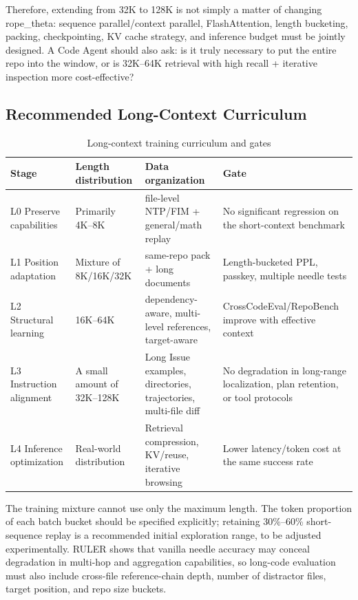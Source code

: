 \documentclass[10pt,a4paper,UTF8,fontset=none]{ctexart}
\newcommand{\ident}[1]{{\rmfamily #1}}
\begin{document}
Therefore, extending from 32K to 128K is not simply a matter of changing \ident{rope\_theta}: sequence parallel/context parallel, FlashAttention, length bucketing, packing, checkpointing, KV cache strategy, and inference budget must be jointly designed. A Code Agent should also ask: is it truly necessary to put the entire repo into the window, or is 32K--64K retrieval with high recall + iterative inspection more cost-effective?

\subsection{Recommended Long-Context Curriculum}

\begin{table}[htbp]
\centering
\caption{Long-context training curriculum and gates}
\label{en:tab:long-curriculum}
\small
\begin{tabularx}{\textwidth}{p{2.2cm}p{2.5cm}YY}
\toprule
Stage & Length distribution & Data organization & Gate \\
\midrule
L0 Preserve capabilities & Primarily 4K--8K & file-level NTP/FIM + general/math replay & No significant regression on the short-context benchmark \\
L1 Position adaptation & Mixture of 8K/16K/32K & same-repo pack + long documents & Length-bucketed PPL, passkey, multiple needle tests \\
L2 Structural learning & 16K--64K & dependency-aware, multi-level references, target-aware & CrossCodeEval/RepoBench improve with effective context \\
L3 Instruction alignment & A small amount of 32K--128K & Long Issue examples, directories, trajectories, multi-file diff & No degradation in long-range localization, plan retention, or tool protocols \\
L4 Inference optimization & Real-world distribution & Retrieval compression, KV/reuse, iterative browsing & Lower latency/token cost at the same success rate \\
\bottomrule
\end{tabularx}
\end{table}

The training mixture cannot use only the maximum length. The token proportion of each batch bucket should be specified explicitly; retaining 30\%--60\% short-sequence replay is a recommended initial exploration range, to be adjusted experimentally. RULER shows that vanilla needle accuracy may conceal degradation in multi-hop and aggregation capabilities\cite{en:hsieh2024ruler}, so long-code evaluation must also include cross-file reference-chain depth, number of distractor files, target position, and repo size buckets.
\end{document}
